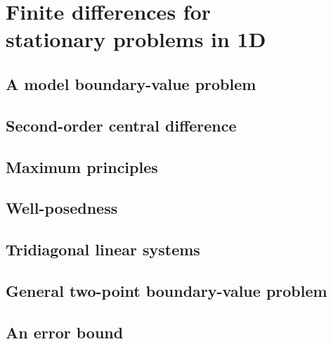 \chapter[Finite differences in 1D]{Finite differences for \\ 
stationary problems in 1D}

\section{A model boundary-value problem}

\section{Second-order central difference}

\section{Maximum principles}

\section{Well-posedness}

\section{Tridiagonal linear systems}

\section{General two-point boundary-value problem}

\section{An error bound}
